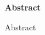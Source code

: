 \thispagestyle{empty}
\vspace{8cm}
\noindent
{\centerline {\bf \large Abstract}}
\vspace{1cm}
\noindent

Abstract